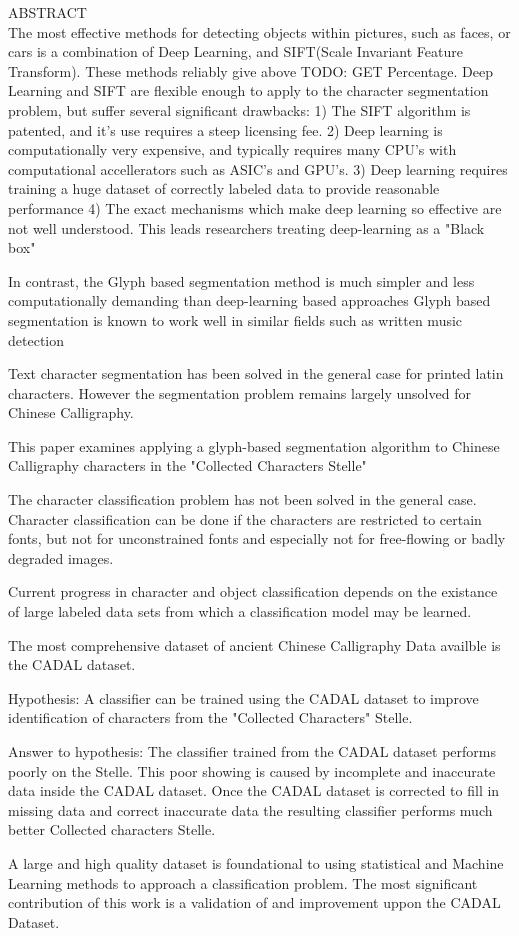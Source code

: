 ABSTRACT\\


The most effective methods for detecting objects within pictures, such as faces, or cars is a combination of Deep Learning, and SIFT(Scale Invariant Feature Transform).  These methods reliably give above TODO: GET Percentage.  Deep Learning and SIFT are flexible enough to apply to the character segmentation problem, but suffer several significant drawbacks:
    1) The SIFT algorithm is patented, and it's use requires a steep licensing fee.
    2) Deep learning is computationally very expensive, and typically requires many CPU's with computational accellerators such as ASIC's and GPU's.
    3) Deep learning requires training a huge dataset of correctly labeled data to provide reasonable performance
    4) The exact mechanisms which make deep learning so effective are not well understood.  This leads researchers treating deep-learning as a "Black box"
    
In contrast, the Glyph based segmentation method is much simpler and less computationally demanding than deep-learning based approaches
    Glyph based segmentation is known to work well in similar fields such as written music detection
    



Text character segmentation has been solved in the general case for printed latin characters.  However the segmentation problem remains largely unsolved for Chinese Calligraphy.

This paper examines applying a glyph-based segmentation algorithm to Chinese Calligraphy characters in the "Collected Characters Stelle"

The character classification problem has not been solved in the general case.  Character classification can be done if the characters are restricted to certain fonts, but not for unconstrained fonts and especially not for free-flowing or badly degraded images.

Current progress in character and object classification depends on the existance of large labeled data sets from which a classification model may be learned.

The most comprehensive dataset of ancient Chinese Calligraphy Data availble is the CADAL dataset.

Hypothesis:  A classifier can be trained using the CADAL dataset to improve identification of characters from the "Collected Characters" Stelle.

Answer to hypothesis:  The classifier trained from the CADAL dataset performs poorly on the Stelle.  This poor showing is caused by incomplete and inaccurate data inside the CADAL dataset.  Once the CADAL dataset is corrected to fill in missing data and correct inaccurate data the resulting classifier performs much better Collected characters Stelle.

A large and high quality dataset is foundational to using statistical and Machine Learning methods to approach a classification problem.  The most significant contribution of this work is a validation of and improvement uppon the CADAL Dataset.

\newpage
